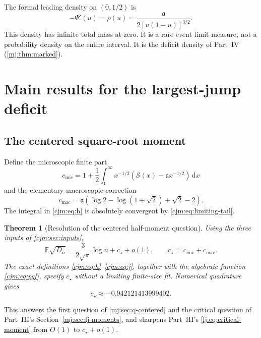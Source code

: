\documentclass[11pt,a4paper]{article}
\newtheorem{theorem}{Theorem}[section]
\theoremstyle{definition}\newaliascnt{definition}{theorem}
\theoremstyle{remark}\newaliascnt{remark}{theorem}
\newcommand{\dd}{\mathrm d}
\newcommand{\ljE}{\mathbb E}
\newcommand{\cjmic}{c_{\mathrm{mic}}}
\newcommand{\cjmac}{c_{\mathrm{mac}}}
\begin{document}
The formal leading density on $(0,1/2)$ is
\begin{equation}
 -\Psi'(u)=\rho(u)=\frac{\mathfrak a}{2[u(1-u)]^{3/2}}.
 \label{cjm:eq:bulk-density}
\end{equation}
This density has infinite total mass at zero. It is a rare-event limit
measure, not a probability density on the entire interval. It is the
deficit density of Part~IV (\cref{mj:thm:marked}).

\section{Main results for the largest-jump deficit}
\label{cjm:sec:main}

\subsection{The centered square-root moment}
Define the microscopic finite part
\begin{equation}
 \cjmic=1+\frac12\int_1^\infty x^{-1/2}
       \left(\mathcal S(x)-\mathfrak a x^{-1/2}\right)\,\dd x
 \label{cjm:eq:h}
\end{equation}
and the elementary macroscopic correction
\begin{equation}
 \cjmac=\mathfrak a\left(\log2-\log(1+\sqrt2)+\sqrt2-2\right).
 \label{cjm:eq:j}
\end{equation}
The integral in \eqref{cjm:eq:h} is absolutely convergent by
\eqref{cjm:eq:limiting-tail}.

\begin{theorem}[Resolution of the centered half-moment question]
\label{cjm:thm:critical}
Using the three inputs of \cref{cjm:sec:inputs},
\begin{equation}
 \ljE\sqrt{D_n}=\frac3{2\sqrt\pi}\log n+c_\star+o(1),\qquad
 c_\star=\cjmic+\cjmac.
 \label{cjm:eq:critical}
\end{equation}
The exact definitions \eqref{cjm:eq:h}--\eqref{cjm:eq:j}, together with the
algebraic function \eqref{cjm:eq:pgf}, specify $c_\star$ without a limiting
finite-size fit. Numerical quadrature gives
\[
 c_\star\approx-0.942121413999402.
\]
\end{theorem}

This answers the first question of \cref{mj:sec:q-centered} and the critical
question of Part~III's Section~\ref{mj:sec:lj-moments}, and sharpens Part~III's
\eqref{lj:eq:critical-moment} from $O(1)$ to $c_\star+o(1)$.
\end{document}
